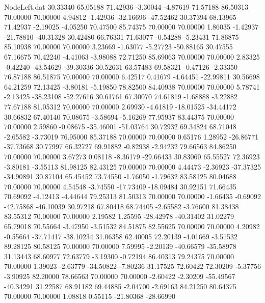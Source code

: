 \begin{filecontents}{NodeLeft.dat}
  30.33340   65.05188   71.42936    -3.30044   -4.87619   71.57188   86.50313   70.00000   70.00000    4.94812   -1.42936  -32.16696  -47.52462
  30.37394   68.13965   71.42937    -2.19025   -4.05250   70.47500   85.74375   70.00000   70.00000    1.86035   -1.42937  -21.78810  -40.31328
  30.42480   66.76331   71.63077    -0.54288   -5.23431   71.86875   85.10938   70.00000   70.00000    3.23669   -1.63077   -5.27723  -50.88165
  30.47555   67.16675   70.42240    -4.41063   -3.98088   72.71250   85.69063   70.00000   70.00000    2.83325   -0.42240  -43.54629  -39.30336
  30.52631   63.57483   69.58321    -0.47126   -2.33350   76.87188   86.51875   70.00000   70.00000    6.42517    0.41679   -4.64451  -22.99811
  30.56698   64.21259   72.13425    -3.80181   -5.19850   78.82500   84.40938   70.00000   70.00000    5.78741   -2.13425  -38.23108  -52.27616
  30.61761   67.30070   74.61819    -1.68888   -3.22882   77.67188   81.05312   70.00000   70.00000    2.69930   -4.61819  -18.01525  -34.44172
  30.66832   67.40140   70.08675    -3.58694   -5.16269   77.95937   83.44375   70.00000   70.00000    2.59860   -0.08675  -35.46001  -51.03764
  30.72932   69.34824   68.71048    -2.65582   -3.73019   76.95000   85.37188   70.00000   70.00000    0.65176    1.28952  -26.86771  -37.73668
  30.77997   66.32727   69.91882    -0.82938   -2.94232   79.66563   84.86250   70.00000   70.00000    3.67273    0.08118   -8.36179  -29.66433
  30.83060   65.55527   72.36923    -3.80181   -3.55113   81.98125   82.43125   70.00000   70.00000    4.44473   -2.36923  -37.37325  -34.90891
  30.87104   65.45452   73.74550    -1.76050   -1.79632   83.58125   80.04688   70.00000   70.00000    4.54548   -3.74550  -17.73409  -18.09484
  30.92151   71.66435   70.69092    -4.12413   -4.44644   79.25313   81.50313   70.00000   70.00000   -1.66435   -0.69092  -42.75868  -46.10039
  30.97218   67.80418   68.74405    -2.65582   -3.76600   81.38438   83.55312   70.00000   70.00000    2.19582    1.25595  -28.42978  -40.31402
  31.02279   65.79018   70.55664    -3.47950   -3.51532   84.51875   82.55625   70.00000   70.00000    4.20982   -0.55664  -37.71417  -38.10234
  31.06358   62.40005   72.20139    -4.01669   -3.51532   89.28125   80.58125   70.00000   70.00000    7.59995   -2.20139  -40.66579  -35.58978
  31.13443   68.60977   72.63779    -3.19300   -0.72194   86.40313   79.24375   70.00000   70.00000    1.39023   -2.63779  -34.50822   -7.80236
  31.17525   72.60422   72.30209    -5.37756   -3.90925   82.20000   78.66563   70.00000   70.00000   -2.60422   -2.30209  -55.49567  -40.34291
  31.22587   68.91182   69.44885    -2.04700   -2.69163   84.21250   80.64375   70.00000   70.00000    1.08818    0.55115  -21.80368  -28.66990

\end{filecontents}
